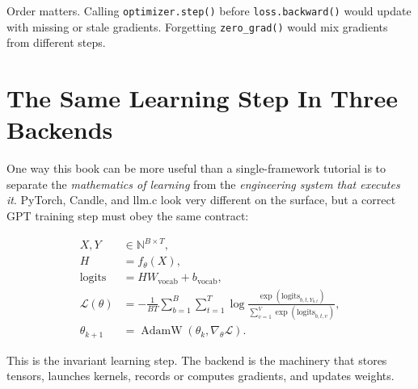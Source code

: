 \begin{center}
\end{center}

Order matters. Calling \texttt{optimizer.step()} before \texttt{loss.backward()} would update with missing or stale gradients. Forgetting \texttt{zero\_grad()} would mix gradients from different steps.

\section{The Same Learning Step In Three Backends}

One way this book can be more useful than a single-framework tutorial is to separate the
\emph{mathematics of learning} from the \emph{engineering system that executes it}.
PyTorch, Candle, and llm.c look very different on the surface, but a correct GPT training
step must obey the same contract:

\[
\begin{aligned}
X, Y &\in \mathbb{N}^{B \times T},\\
H &= f_\theta(X),\\
\text{logits} &= H W_{\text{vocab}} + b_{\text{vocab}},\\
\mathcal{L}(\theta) &=
-\frac{1}{BT}\sum_{b=1}^{B}\sum_{t=1}^{T}
\log
\frac{\exp(\text{logits}_{b,t,Y_{b,t}})}
{\sum_{v=1}^{V}\exp(\text{logits}_{b,t,v})},\\
\theta_{k+1} &= \operatorname{AdamW}(\theta_k,\nabla_\theta \mathcal{L}).
\end{aligned}
\]

This is the invariant learning step. The backend is the machinery that stores tensors,
launches kernels, records or computes gradients, and updates weights.

